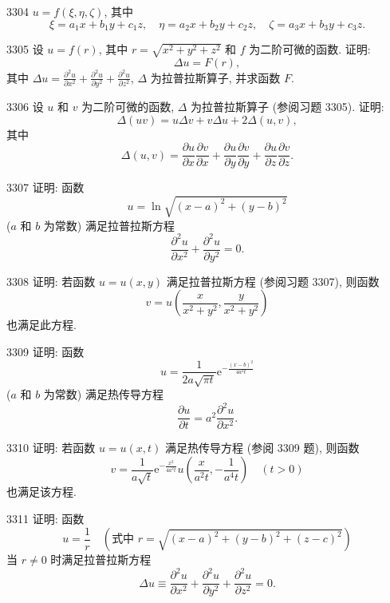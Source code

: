 \begin{prob}[M]{3304}
$u = f(\xi, \eta, \zeta)$, 其中
\[
\xi = a_1 x + b_1 y + c_1 z, \quad \eta = a_2 x + b_2 y + c_2 z, \quad \zeta = a_3 x + b_3 y + c_3 z.
\]
\end{prob}

\begin{prob}[M]{3305}
设 $u = f(r)$, 其中 $r = \sqrt{x^2 + y^2 + z^2}$ 和 $f$ 为二阶可微的函数. 证明:
\[
\Delta u = F(r),
\]
其中 $\Delta u = \frac{\partial^2 u}{\partial x^2} + \frac{\partial^2 u}{\partial y^2} + \frac{\partial^2 u}{\partial z^2}$, $\Delta$ 为拉普拉斯算子, 并求函数 $F$.
\end{prob}

\begin{prob}[M]{3306}
设 $u$ 和 $v$ 为二阶可微的函数, $\Delta$ 为拉普拉斯算子 (参阅习题 3305). 证明:
\[
\Delta(uv) = u\Delta v + v\Delta u + 2\Delta(u, v),
\]
其中
\[
\Delta(u, v) = \frac{\partial u}{\partial x}\frac{\partial v}{\partial x} + \frac{\partial u}{\partial y}\frac{\partial v}{\partial y} + \frac{\partial u}{\partial z}\frac{\partial v}{\partial z}.
\]
\end{prob}

\begin{prob}[M]{3307}
证明: 函数
\[
u = \ln\sqrt{(x - a)^2 + (y - b)^2}
\]
($a$ 和 $b$ 为常数) 满足拉普拉斯方程
\[
\frac{\partial^2 u}{\partial x^2} + \frac{\partial^2 u}{\partial y^2} = 0.
\]
\end{prob}

\begin{prob}[M]{3308}
证明: 若函数 $u = u(x, y)$ 满足拉普拉斯方程 (参阅习题 3307), 则函数
\[
v = u\left(\frac{x}{x^2 + y^2}, \frac{y}{x^2 + y^2}\right)
\]
也满足此方程.
\end{prob}

\begin{prob}[M]{3309}
证明: 函数
\[
u = \frac{1}{2a\sqrt{\pi t}}\mathrm{e}^{-\frac{(x - b)^2}{4a^2 t}}
\]
($a$ 和 $b$ 为常数) 满足热传导方程
\[
\frac{\partial u}{\partial t} = a^2\frac{\partial^2 u}{\partial x^2}.
\]
\end{prob}

\begin{prob}[M]{3310}
证明: 若函数 $u = u(x, t)$ 满足热传导方程 (参阅 3309 题), 则函数
\[
v = \frac{1}{a\sqrt{t}}\mathrm{e}^{-\frac{x^2}{4a^2 t}} u\left(\frac{x}{a^2 t}, -\frac{1}{a^4 t}\right) \quad (t > 0)
\]
也满足该方程.
\end{prob}

\begin{prob}[M]{3311}
证明: 函数
\[
u = \frac{1}{r} \quad \left(\text{式中 } r = \sqrt{(x - a)^2 + (y - b)^2 + (z - c)^2}\right)
\]
当 $r \neq 0$ 时满足拉普拉斯方程
\[
\Delta u \equiv \frac{\partial^2 u}{\partial x^2} + \frac{\partial^2 u}{\partial y^2} + \frac{\partial^2 u}{\partial z^2} = 0.
\]
\end{prob}

